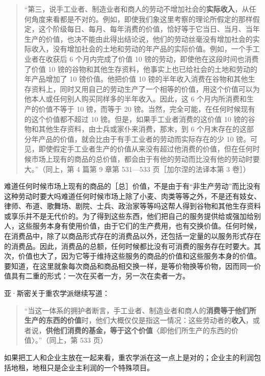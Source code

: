 \begin{quote}“第三，说手工业者、制造业者和商人的劳动不增加社会的\textbf{实际收入}，从任何角度来看都是不对的。例如，即使我们象这里考察的理论所假定的那样假定，这个阶级每日、每月、每年消费的价值，恰好等于它当日、当月、当年生产的价值，也决不能由此得出结论说，他们的劳动丝毫没有增加社会的实际收入，没有增加社会的土地和劳动的年产品的实际价值。例如，一个手工业者在收获后 6 个月内完成了价值 10 镑的劳动，即使他在这段时间也消费了价值 10 镑的谷物和其他生存资料，他事实上也已给社会的土地和劳动的年产品增加了 10 镑价值。他把价值 10 镑的半年收入消费在谷物和其他生存资料上，同时又用自己的劳动生产了一个相等的价值，用这个价值可以为他本人或任何别人购买同样多的半年收入。因此，这 6 个月内所消费和生产的价值不等于 10 镑，而等于 20 镑。当然，完全可能，在任何时候现有的这个价值都不超过 10 镑。但是，如果手工业者消费的这价值 10 镑的谷物和其他生存资料，由士兵或家仆来消费，那末，到 6 个月末存在的这部分年产品的价值，就会比由于有手工业者的劳动而实际存在的少 10 镑。可见，即使假定手工业者生产的价值从来没有超过他消费的价值，但在任何时候市场上现有的商品的总价值，都会由于有他的劳动而比没有他的劳动时要大。”（同上，第 4 篇第 9 章第 531—533 页［加尔涅的法译本第 3 卷］）\end{quote}

难道任何时候市场上现有的商品的［总］价值，不是由于有“非生产劳动”而比没有这种劳动时要大吗难道任何时候市场上除了小麦、肉类等等之外，不是还有妓女、律师、布道、歌舞场、剧院、士兵、政治家等等吗这帮人得到谷物和其他生存资料或享乐并不是无代价的。为了得到这些东西，他们把自己的服务提供给或强加给别人，这些服务本身有使用价值，由于它们的生产费用，也有交换价值。任何时候，在消费品中，除了以商品形式存在的消费品以外，还包括一定量的以服务形式存在的消费品。因此，消费品的总额，任何时候都比没有可消费的服务存在时要大。其次，价值也大了，因为它等于维持这些服务的商品的价值和这些服务本身的价值。要知道，在这里就象每次商品和商品相交换一样，是等价物换等价物，因而同一价值具有二重的形式：一次在买者一方，另一次在卖者一方。

\fontbox{~\{}亚·斯密关于重农学派继续写道：

\begin{quote}“当这一体系的拥护者断言，手工业者、制造业者和商人的\textbf{消费等于他们所生产的东西的价值}时，他们大概仅仅是指这一情况：这些劳动者的\textbf{收入}，或者说，\textbf{供他们消费的基金，等于这个价值}〈即他们所生产的东西的价值〉。”（同上，第 533 页）\end{quote}

如果把工人和企业主放在一起来看，重农学派在这一点上是对的；企业主的利润包括地租，地租只是企业主利润的一个特殊项目。\fontbox{\}~}

